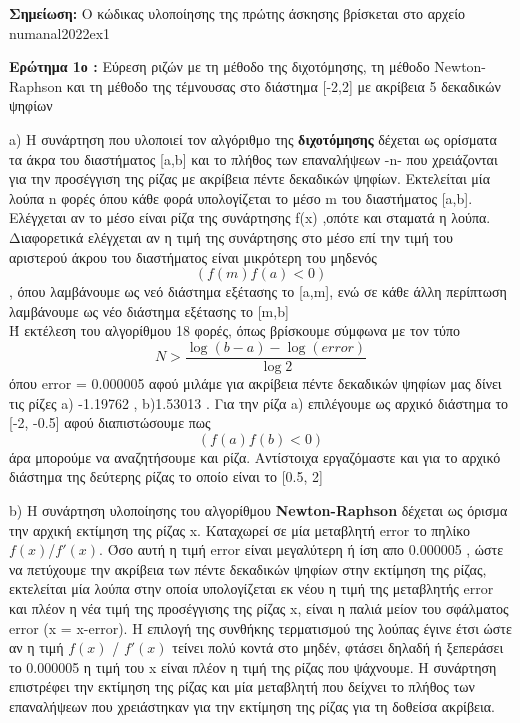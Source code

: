 \documentclass{article}
\begin{document}
\textbf{\large{Σημείωση:} } Ο κώδικας υλοποίησης της πρώτης άσκησης βρίσκεται στο αρχείο numanal2022ex1
\par\textbf{\large{Ερώτημα 1ο }:}
{Εύρεση ριζών με τη μέθοδο της διχοτόμησης, τη μέθοδο Newton-Raphson και τη μέθοδο της τέμνουσας στο διάστημα [-2,2] με ακρίβεια 5 δεκαδικών ψηφίων}\\
\par 
a)  Η συνάρτηση που υλοποιεί τον αλγόριθμο της \textbf{διχοτόμησης} δέχεται ως ορίσματα τα άκρα του διαστήματος [a,b] και το πλήθος των επαναλήψεων -n- που χρειάζονται για την προσέγγιση της ρίζας με ακρίβεια πέντε δεκαδικών ψηφίων. Εκτελείται μία λούπα n φορές όπου κάθε φορά υπολογίζεται το μέσο m του διαστήματος [a,b]. Ελέγχεται αν το μέσο είναι ρίζα της συνάρτησης f(x) ,οπότε και σταματά η λούπα. Διαφορετικά ελέγχεται αν η τιμή της συνάρτησης στο μέσο επί την τιμή του αριστερού άκρου του διαστήματος είναι μικρότερη του μηδενός \begin{equation*}
(f(m)f(a) < 0)\end{equation*}, όπου λαμβάνουμε ως νεό διάστημα εξέτασης το [a,m], ενώ σε κάθε άλλη περίπτωση λαμβάνουμε ως νέο διάστημα εξέτασης το [m,b]
\\
Ή εκτέλεση του αλγορίθμου 18 φορές, όπως βρίσκουμε σύμφωνα με τον τύπο 
\begin{equation*}
    N > \frac{\log(b-a) - \log(error)}{\log2}
\end{equation*}
όπου error = 0.000005 αφού μιλάμε για ακρίβεια πέντε δεκαδικών ψηφίων μας δίνει τις ρίζες a) -1.19762 , b)1.53013
. Για την ρίζα a) επιλέγουμε ως αρχικό διάστημα το [-2, -0.5] αφού διαπιστώσουμε πως 
\begin{equation*}
(f(a)f(b) < 0)\end{equation*} άρα μπορούμε να αναζητήσουμε και ρίζα. Αντίστοιχα εργαζόμαστε και για το αρχικό διάστημα της δεύτερης ρίζας το οποίο είναι το [0.5, 2]\\
\par
b) Η συνάρτηση υλοποίησης του αλγορίθμου \textbf{Newton-Raphson} δέχεται ως όρισμα την αρχική εκτίμηση της ρίζας x. Καταχωρεί σε μία μεταβλητή error το πηλίκο $f(x)$/$f'(x)$. Όσο αυτή η τιμή error είναι μεγαλύτερη ή ίση απο 0.000005 , ώστε να πετύχουμε την ακρίβεια των πέντε δεκαδικών ψηφίων στην εκτίμηση της ρίζας, εκτελείται μία λούπα στην οποία υπολογίζεται εκ νέου η τιμή της μεταβλητής error και πλέον η νέα τιμή της προσέγγισης της ρίζας x, είναι η παλιά μείον του σφάλματος error (x = x-error). Η επιλογή της συνθήκης τερματισμού της λούπας έγινε έτσι ώστε αν η τιμή $f(x)$ / $f'(x)$ τείνει πολύ κοντά στο μηδέν, φτάσει δηλαδή ή ξεπεράσει το 0.000005 η τιμή του x είναι πλέον η τιμή της ρίζας που ψάχνουμε. Η συνάρτηση επιστρέφει την εκτίμηση της ρίζας και μία μεταβλητή που δείχνει το πλήθος των επαναλήψεων που χρειάστηκαν για την εκτίμηση της ρίζας για τη δοθείσα ακρίβεια. 
\end{document}
